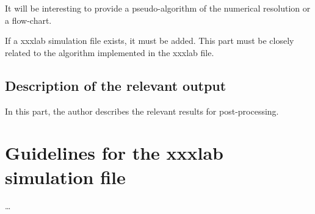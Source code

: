 \documentclass[10pt]{article}
\begin{document}
It will be interesting to provide a pseudo-algorithm of the numerical resolution or a flow-chart.

If a xxxlab simulation file exists, it must be added. This part must be closely related to the algorithm implemented in the xxxlab file.
\subsection{Description of the relevant output}
\label{Sec:Output}
In this part, the author describes the relevant results for post-processing.

\section{Guidelines for the xxxlab simulation file}
\ldots
\end{document}
